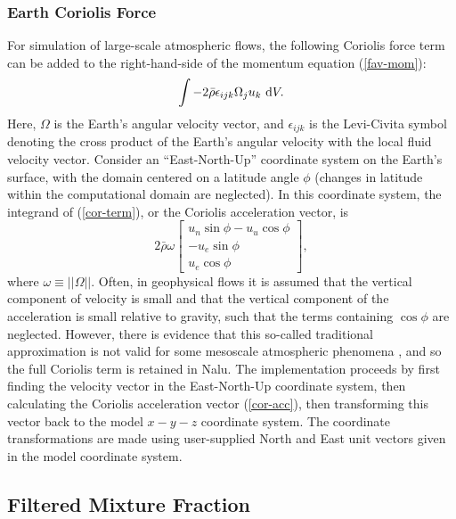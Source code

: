 \subsubsection{Earth Coriolis Force}
For simulation of large-scale atmospheric flows, the following Coriolis force
term can be added to the right-hand-side of the momentum equation
(\ref{fav-mom}):
\begin{equation} \label{cor-term}
  \int -2\bar{\rho}\epsilon_{ijk}\Omega_ju_k ~{\rm d}V.
\end{equation}
Here, $\Omega$ is the Earth's angular velocity vector, and
$\epsilon_{ijk}$ is the Levi-Civita symbol denoting the cross product
of the Earth's angular velocity with the local fluid velocity
vector. Consider an ``East-North-Up'' coordinate system on the Earth's
surface, with the domain centered on a latitude angle $\phi$ (changes
in latitude within the computational domain are neglected). In this
coordinate system, the integrand of (\ref{cor-term}), or the Coriolis
acceleration vector, is
\begin{equation} \label{cor-acc}
  2 \bar{\rho} \omega
  \begin{bmatrix} u_n \sin\phi - u_u \cos\phi \\
                  -u_e \sin\phi \\
                  u_e \cos\phi
  \end{bmatrix},
\end{equation}
where $\omega \equiv ||\Omega||$.  Often, in geophysical flows it is
assumed that the vertical component of velocity is small and that the
vertical component of the acceleration is small relative to gravity,
such that the terms containing $\cos\phi$ are neglected.  However,
there is evidence that this so-called traditional approximation is not
valid for some mesoscale atmospheric phenomena \cite{Gerkema_etal:08},
and so the full Coriolis term is retained in Nalu.  The implementation
proceeds by first finding the velocity vector in the East-North-Up
coordinate system, then calculating the Coriolis acceleration vector
(\ref{cor-acc}), then transforming this vector back to the model
$x-y-z$ coordinate system.  The coordinate transformations are made
using user-supplied North and East unit vectors given in the model
coordinate system.
 
\subsection{Filtered Mixture Fraction} \label{sec:filtered_Z}

